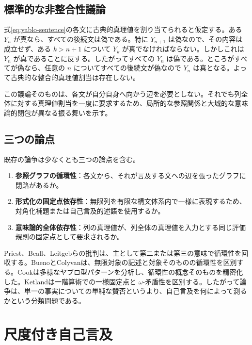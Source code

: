 \documentclass[a4paper,11pt]{ltjsarticle}
\theoremstyle{definition}
\theoremstyle{plain}
\begin{document}
\subsection{標準的な非整合性議論}

式\eqref{eq:yablo-sentence}の各文に古典的真理値を割り当てられると仮定する。ある $Y_n$ が真なら、すべての後続文は偽である。特に $Y_{n+1}$ は偽なので、その内容は成立せず、ある $k>n+1$ について $Y_k$ が真でなければならない。しかしこれは $Y_n$ が真であることに反する。したがってすべての $Y_n$ は偽である。ところがすべてが偽なら、任意の $n$ についてすべての後続文が偽なので $Y_n$ は真となる。よって古典的な整合的真理値割当は存在しない。

この議論そのものは、各文が自分自身へ向かう辺を必要としない。それでも列全体に対する真理値割当を一度に要求するため、局所的な参照関係と大域的な意味論的閉包が異なる振る舞いを示す。

\subsection{三つの論点}

既存の論争は少なくとも三つの論点を含む。
\begin{enumerate}
 \item \textbf{参照グラフの循環性}：各文から、それが言及する文への辺を張ったグラフに閉路があるか。
 \item \textbf{形式化の固定点依存性}：無限列を有限な構文体系内で一様に表現するため、対角化補題または自己言及的述語を使用するか。
 \item \textbf{意味論的全体依存性}：列の真理値が、列全体の真理値を入力とする同じ評価規則の固定点として要求されるか。
\end{enumerate}

Priest、Beall、Leitgebらの批判は、主として第二または第三の意味で循環性を回収する\cite{Priest1997Yablo,Beall2001Yablo,Leitgeb2002Yablo}。BuenoとColyvanは、無限対象の記述と対象そのものの循環性を区別する\cite{BuenoColyvan2003Yablo}。Cookは多様なヤブロ型パターンを分析し、循環性の概念そのものを精密化した\cite{Cook2004Patterns,Cook2014Yablo}。Ketlandは一階算術での一様固定点と $\omega$-矛盾性を区別する\cite{Ketland2005Yablo}。したがって論争は、単一の事実についての単純な賛否というより、自己言及を何によって測るかという分類問題である。

\section{尺度付き自己言及}
\end{document}
